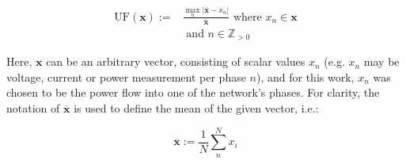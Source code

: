 \begin{equation}
\begin{split}	
	\text{UF}(\textbf{x}) :=& \frac{\max_n |\overline{\textbf{x}} - x_n|}{\overline{\textbf{x}}} \text{ where } x_n \in \textbf{x} \\
	&\text{ and } n \in \mathbb{Z}_{>0}
\end{split}
\label{ch1:equ:unbalance-equation}
\end{equation}

Here, $\textbf{x}$ can be an arbitrary vector, consisting of scalar values $x_n$ (e.g. $x_n$ may be voltage, current or power measurement per phase $n$), and for this work, $x_n$ was chosen to be the power flow into one of the network's phases.
For clarity, the notation of $\overline{\textbf{x}}$ is used to define the mean of the given vector, i.e.:

\begin{equation}
	\overline{\textbf{x}} := \frac{1}{N}\sum_n^N{x_i}
\end{equation}